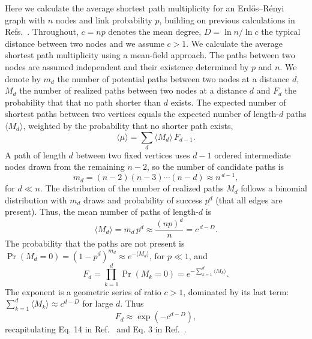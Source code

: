 \documentclass[reprint,aps,pre,amsmath,amssymb,superscriptaddress,showpacs]{revtex4-1}
\begin{document}
\noindent Here we calculate the average shortest path multiplicity for  an Erd\H{o}s--R\'enyi graph with $n$ nodes and link probability $p$, building on previous calculations in Refs.~\cite{Fronczak2004, distance_stats_baronchelli_2006, Blondel2007, SoleRibalta2019}. Throughout, $c= np$ denotes the mean degree, $D=\ln n /\ln c$ the typical distance between two nodes and we assume $c>1$. We calculate the average shortest path multiplicity using a mean-field approach. The paths between two nodes are assumed independent and their existence determined by $p$ and $n$. We denote by $m_d$ the number of potential paths between two nodes at a distance $d$, $M_d$ the number of realized paths between two nodes at a distance $d$ and $F_d$ the probability that that no path shorter than $d$ exists. The expected number of shortest paths between two vertices equals the expected number of length-$d$ paths $\langle M_d\rangle$, weighted by the probability that no shorter path exists,
%
\begin{equation}
\langle\mu\rangle = \sum_{d}\langle M_d\rangle\,F_{d-1}.
\label{mu_avg}
\end{equation}
%
A path of length $d$ between two fixed vertices uses $d-1$ ordered intermediate nodes drawn from the remaining $n-2$, so the number of candidate paths is
%
\begin{equation}
m_d = (n-2)(n-3)\cdots(n-d)\approx n^{\,d-1},
\label{md}
\end{equation}
%
for $d\ll n$. The distribution of the number of realized paths $M_d$ follows a binomial distribution with $m_d$ draws and probability of success $p^d$ (that all edges are present). Thus, the mean number of paths of length-$d$ is
%
\begin{equation}
\langle M_d\rangle = m_d\,p^{d} \approx \frac{(np)^{d}}{n} = c^{\,d-D}.
\label{Md}
\end{equation}
%
The probability that the paths are not present is $\Pr(M_d=0) =(1-p^d)^{m_d} \approx e^{ - \langle M_d\rangle }$, for $p\ll1$, and
%
\begin{equation}
F_d = \prod_{k=1}^d \Pr(M_k=0) = e^{-\sum_{k=1}^{d}\langle M_k\rangle}.
\label{eq:Fsum}
\end{equation}
%
The exponent is a geometric series of ratio $c>1$, dominated by its last term: $\sum_{k=1}^{d}\langle M_k\rangle \approx c^{d-D}$ for large $d$. Thus
%
\begin{equation}
F_d \approx  \exp\left( -c^{d-D} \right),
\label{Fd}
\end{equation}
%
recapitulating Eq. 14 in Ref.~\cite{Fronczak2004} and Eq. 3 in Ref.~\cite{Blondel2007}.
\end{document}
